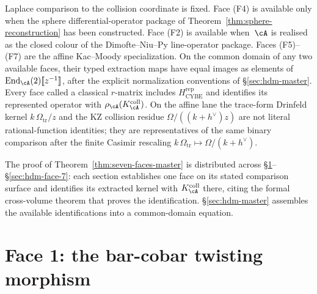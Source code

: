 \begin{theorem}
Laplace comparison to the collision coordinate is fixed. Face
\textup{(F4)} is available only when the sphere differential-operator
package of Theorem~\ref{thm:sphere-reconstruction} has been
constructed. Face \textup{(F2)} is available when~$\cA$ is realised as
the closed colour of the Dimofte--Niu--Py line-operator package.
Faces \textup{(F5)}--\textup{(F7)} are the affine
Kac--Moody specialization. On the common domain of any two available
faces, their typed extraction maps have equal images as elements of
$\mathrm{End}_\cA(2)[\![z^{-1}]\!]$, after the explicit
normalization conventions of \S\ref{sec:hdm-master}.  Every face
called a classical $r$-matrix includes
$H_{\mathrm{CYBE}}^{\mathrm{rep}}$ and identifies its represented
operator with $\rho_\cA(K_\cA^{\mathrm{coll}})$. On the affine
lane the trace-form Drinfeld kernel
$k\,\Omega_{\mathrm{tr}}/z$ and the KZ collision residue
$\Omega/((k+h^\vee)z)$ are not literal rational-function identities;
they are representatives of the same binary comparison after the
finite Casimir rescaling
$k\,\Omega_{\mathrm{tr}}\mapsto\Omega/(k+h^\vee)$.
\end{theorem}

\noindent The proof of Theorem~\ref{thm:seven-faces-master} is
distributed across \S\ref{sec:hdm-face-1}--\S\ref{sec:hdm-face-7}:
each section establishes one face on its stated comparison surface and
identifies its extracted kernel with $K_\cA^{\mathrm{coll}}$ there,
citing the formal
cross-volume theorem that proves the identification.
\S\ref{sec:hdm-master} assembles the available identifications into a
common-domain equation.

\section{Face 1: the bar-cobar twisting morphism}
\label{sec:hdm-face-1}

